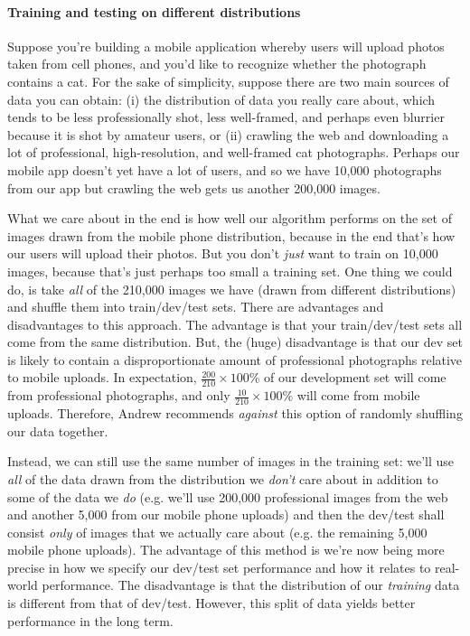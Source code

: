 \documentclass[12pt]{article}
\begin{document}
\paragraph{Training and testing on different distributions} Suppose you're building a mobile application whereby users will
upload photos taken from cell phones, and you'd like to recognize whether the photograph contains a cat. For the sake of simplicity,
suppose there are two main sources of data you can obtain: (i) the distribution of data you really care about, which tends to be
less professionally shot, less well-framed, and perhaps even blurrier because it is shot by amateur users, or (ii) crawling the web
and downloading a lot of professional, high-resolution, and well-framed cat photographs. Perhaps our mobile app doesn't yet have
a lot of users, and so we have 10,000 photographs from our app but crawling the web gets us another 200,000 images.

What we care about in the end is how well our algorithm performs on the set of images drawn from the mobile phone 
distribution, because in the end that's how our users will upload their photos. But you don't \emph{just} want to train
on 10,000 images, because that's just perhaps too small a training set. One thing we could do, is take \emph{all} of the 210,000
images we have (drawn from different distributions) and shuffle them into train/dev/test sets. There are advantages and disadvantages to this approach. The advantage is that your train/dev/test sets all come from the same distribution. But, the (huge) disadvantage
is that our dev set is likely to contain a disproportionate amount of professional photographs relative to mobile uploads. In expectation, $\frac{200}{210} \times 100 \%$ of our development set will come from professional photographs, and only $\frac{10}{210} \times 100\%$ will come from mobile uploads. Therefore, Andrew recommends \emph{against} this option of randomly shuffling our data together.

Instead, we can still use the same number of images in the training set: we'll use \emph{all} of the data drawn from the distribution we \emph{don't} care about in addition to some of the data we \emph{do} (e.g. we'll use 200,000 professional images from the web and another 5,000 from our mobile phone uploads) and then the dev/test shall consist \emph{only} of images that we actually care about (e.g. the remaining 5,000 mobile phone uploads). The advantage of this method is we're now being more precise in how we specify
our dev/test set performance and how it relates to real-world performance. The disadvantage is that the distribution of our
\emph{training} data is different from that of dev/test. However, this split of data yields better performance in the long term.
\end{document}
